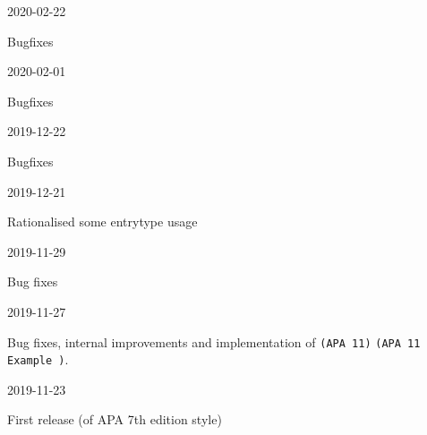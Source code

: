 \documentclass{ltxdockit}
\newcommand\apa[2][]{\ifthenelse{\equal{#1}{}}%
                       {\texttt{(APA #2)}}%
                       {\texttt{(APA #2 Example #1)}}}
\begin{document}
\begin{changelog}

\begin{release}{9.6}{2020-02-22}
\item Bugfixes
\end{release}

\begin{release}{9.5}{2020-02-01}
\item Bugfixes
\end{release}

\begin{release}{9.4}{2019-12-22}
\item Bugfixes
\end{release}

\begin{release}{9.3}{2019-12-21}
\item Rationalised some entrytype usage
\end{release}

\begin{release}{9.2}{2019-11-29}
\item Bug fixes
\end{release}
  
\begin{release}{9.1}{2019-11-27}
\item Bug fixes, internal improvements and implementation of \apa{11}.
\end{release}

\begin{release}{9.0}{2019-11-23}
\item First release (of APA 7th edition style)
\end{release}

\end{changelog}
\end{document}
